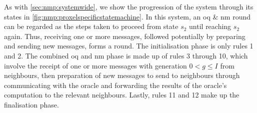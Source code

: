 As with \cref{sec:nmp:systemwide}, we show the progression of the system through its states in \cref{fig:nmp:proxelspecificstatemachine}.  In this system, an \gls{oq} \& \gls{nm} round can be regarded as the steps taken to proceed from state \(s_2\) until reaching \(s_2\) again.  Thus, receiving one or more messages, followed potentially by preparing and sending new messages, forms a round.  The initialisation phase is only rules 1 and 2.  The combined \gls{oq} and \gls{nm} phase is made up of rules 3 through 10, which involve the receipt of one or more messages with generation \(0 < g \leq I\) from neighbours, then preparation of new messages to send to neighbours through communicating with the oracle and forwarding the results of the oracle's computation to the relevant neighbours.  Lastly, rules 11 and 12 make up the finalisation phase.

